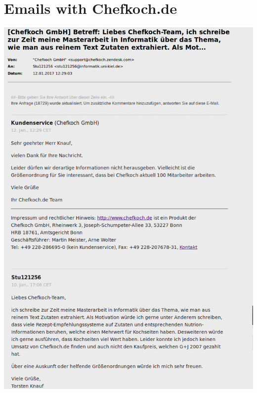 \documentclass[12pt, twoside]{report}
\begin{document}
\chapter{Emails with Chefkoch.de} \label{appendix:emailChefkoch}
\vspace{-1cm}
\includegraphics[width=1\linewidth]{Images/emailChefkoch}

\printbibliography
\end{document}

